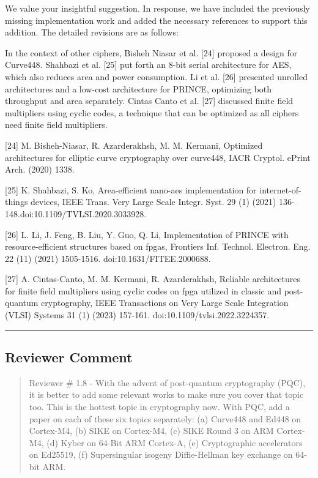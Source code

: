 We value your insightful suggestion. In response, we have included the previously missing implementation work and added the necessary references to support this addition. The detailed revisions are as follows:

\color{blue}

In the context of other ciphers, Bisheh Niasar et al. [24] proposed a design for Curve448. Shahbazi et al. [25] put forth an 8-bit serial architecture for AES, which also reduces area and power consumption. Li et al. [26] presented unrolled architectures and a low-cost architecture for PRINCE, optimizing both throughput and area separately. Cintas Canto et al. [27] discussed finite field multipliers using cyclic codes, a technique that can be optimized as all ciphers need finite field multipliers.

[24] M. Bisheh-Niasar, R. Azarderakhsh, M. M. Kermani, Optimized architectures for elliptic curve cryptography over curve448, IACR Cryptol. ePrint Arch. (2020) 1338.

[25] K. Shahbazi, S. Ko, Area-efficient nano-aes implementation for internet-of-things devices, IEEE Trans. Very Large Scale Integr. Syst. 29 (1) (2021) 136-148.doi:10.1109/TVLSI.2020.3033928.

[26] L. Li, J. Feng, B. Liu, Y. Guo, Q. Li, Implementation of PRINCE with resource-efficient structures based on fpgas, Frontiers Inf. Technol. Electron. Eng. 22 (11) (2021) 1505-1516. doi:10.1631/FITEE.2000688.

[27] A. Cintas-Canto, M. M. Kermani, R. Azarderakhsh, Reliable architectures for finite field multipliers using cyclic codes on fpga utilized in classic and post-quantum cryptography, IEEE Transactions on Very Large Scale Integration (VLSI) Systems 31 (1) (2023) 157-161. \linebreak doi:10.1109/tvlsi.2022.3224357.


\color{black}


\noindent\rule{\linewidth}{2.0pt}

\subsection{Reviewer Comment}
\begin{mdframed}
	\begin{quote}
		Reviewer \# 1.8 - With the advent of post-quantum cryptography (PQC), it is better to add some relevant works to make sure you cover that topic too. This is the hottest topic in cryptography now. With PQC, add a paper on each of these six topics separately: (a) Curve448 and Ed448 on Cortex-M4, (b) SIKE on Cortex-M4, (c) SIKE Round 3 on ARM Cortex-M4, (d) Kyber on 64-Bit ARM Cortex-A, (e) Cryptographic accelerators on Ed25519, (f) Supersingular isogeny Diffie-Hellman key exchange on 64-bit ARM.
	\end{quote}
\end{mdframed}

